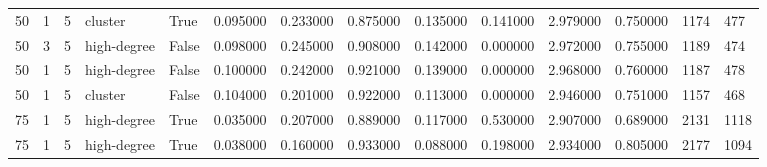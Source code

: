 \begin{table}
\begin{tabular}{llllllllllllll}
50 & 1 & 5 & cluster & True & 0.095000 & 0.233000 & 0.875000 & 0.135000 & 0.141000 & 2.979000 & 0.750000 & 1174 & 477 \\
50 & 3 & 5 & high-degree & False & 0.098000 & 0.245000 & 0.908000 & 0.142000 & 0.000000 & 2.972000 & 0.755000 & 1189 & 474 \\
50 & 1 & 5 & high-degree & False & 0.100000 & 0.242000 & 0.921000 & 0.139000 & 0.000000 & 2.968000 & 0.760000 & 1187 & 478 \\
50 & 1 & 5 & cluster & False & 0.104000 & 0.201000 & 0.922000 & 0.113000 & 0.000000 & 2.946000 & 0.751000 & 1157 & 468 \\
75 & 1 & 5 & high-degree & True & 0.035000 & 0.207000 & 0.889000 & 0.117000 & 0.530000 & 2.907000 & 0.689000 & 2131 & 1118 \\
75 & 1 & 5 & high-degree & True & 0.038000 & 0.160000 & 0.933000 & 0.088000 & 0.198000 & 2.934000 & 0.805000 & 2177 & 1094 \\
\bottomrule
\end{tabular}
\end{table}

